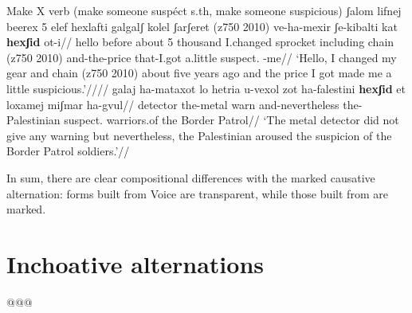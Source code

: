 \pex Make X verb (make someone suspéct s.th, make someone suspicious)
	\a \begingl
		\gla ʃalom lifnej beerex 5 elef hexlafti galgalʃ kolel ʃarʃeret (z750 2010) ve-ha-mexir ʃe-kibalti k{\texttslig}at \textbf{hexʃid} ot-i//
		\glb hello before about 5 thousand I.changed sprocket including chain (z750 2010) and-the-price that-I.got a.little suspect. -me//
		\glft `Hello, I changed my gear and chain (z750 2010) about five years ago and the price I got made me a little suspicious.'////
	\endgl
	\a \begingl
		\gla galaj ha-mataxot lo hetria u-{vexol zot} ha-falestini \textbf{hexʃid} et loxamej {miʃmar ha-gvul}//
		\glb detector the-metal  warn and-nevertheless the-Palestinian suspect.  warriors.of {the Border Patrol}//
		\glft `The metal detector did not give any warning but nevertheless, the Palestinian aroused the suspicion of the Border Patrol soldiers.'//
	\endgl
\xe

In sum, there are clear compositional differences with the marked causative alternation: forms built from Voice are transparent, while those built from {\vz} are marked.


%	
%	
%	
%


	



\section{Inchoative alternations} \label{vd:inch}
@@@


